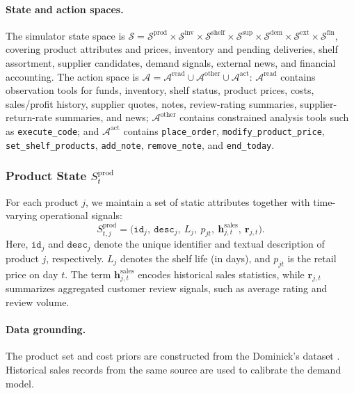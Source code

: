 \paragraph{State and action spaces.}
The simulator state space is $\mathcal{S}=\mathcal{S}^{\mathrm{prod}}\times\mathcal{S}^{\mathrm{inv}}\times\mathcal{S}^{\mathrm{shelf}}\times\mathcal{S}^{\mathrm{sup}}\times\mathcal{S}^{\mathrm{dem}}\times\mathcal{S}^{\mathrm{ext}}\times\mathcal{S}^{\mathrm{fin}}$, covering product attributes and prices, inventory and pending deliveries, shelf assortment, supplier candidates, demand signals, external news, and financial accounting. The action space is $\mathcal{A}=\mathcal{A}^{\mathrm{read}}\cup\mathcal{A}^{\mathrm{other}}\cup\mathcal{A}^{\mathrm{act}}$: $\mathcal{A}^{\mathrm{read}}$ contains observation tools for funds, inventory, shelf status, product prices, costs, sales/profit history, supplier quotes, notes, review-rating summaries, supplier-return-rate summaries, and news; $\mathcal{A}^{\mathrm{other}}$ contains constrained analysis tools such as \texttt{execute\_code}; and $\mathcal{A}^{\mathrm{act}}$ contains \texttt{place\_order}, \texttt{modify\_product\_price}, \texttt{set\_shelf\_products}, \texttt{add\_note}, \texttt{remove\_note}, and \texttt{end\_today}.

\subsubsection{Product State \texorpdfstring{$S_t^{\text{prod}}$}{S t prod}}

For each product $j$, we maintain a set of static attributes together with time-varying operational signals:
\begin{equation}
S_{t,j}^{\text{prod}} =
\big(
\texttt{id}_j,\ \texttt{desc}_j,\ L_j,\ p_{jt},\ \mathbf{h}^{\text{sales}}_{j,t},\ \mathbf{r}_{j,t}
\big).
\end{equation}
Here, $\texttt{id}_j$ and $\texttt{desc}_j$ denote the unique identifier and textual description of product $j$, respectively. $L_j$ denotes the shelf life (in days), and $p_{jt}$ is the retail price on day $t$. The term $\mathbf{h}^{\text{sales}}_{j,t}$ encodes historical sales statistics, while $\mathbf{r}_{j,t}$ summarizes aggregated customer review signals, such as average rating and review volume.

\paragraph{Data grounding.}
The product set and cost priors are constructed from the Dominick’s dataset \citep{DominicksDataset}. Historical sales records from the same source are used to calibrate the demand model.

